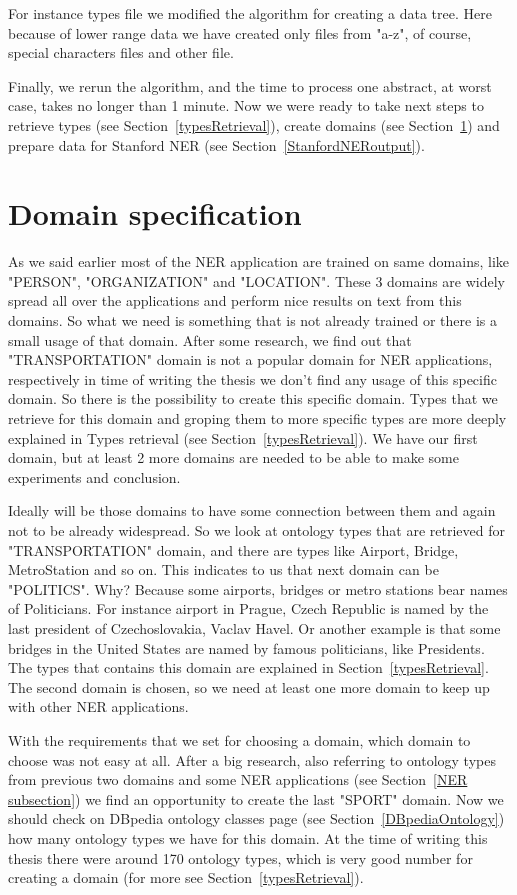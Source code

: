\documentclass[thesis=M,english]{FITthesis}[2018/05/30]
\begin{document}
	For instance types file we modified the algorithm for creating a data tree. Here because of lower range data we have created only files from "a-z", of course, special characters files and other file.

	Finally, we rerun the algorithm, and the time to process one abstract, at worst case, takes no longer than 1 minute. Now we were ready to take next steps to retrieve types (see Section~\ref{typesRetrieval}), create domains (see Section~\ref{domainSpecification}) and prepare data for Stanford NER (see Section~\ref{StanfordNERoutput}).

\section{Domain specification}\label{domainSpecification}
	As we said earlier most of the NER application are trained on same domains, like "PERSON", "ORGANIZATION" and "LOCATION". These 3 domains are widely spread all over the applications and perform nice results on text from this domains. So what we need is something that is not already trained or there is a small usage of that domain. After some research, we find out that "TRANSPORTATION" domain is not a popular domain for NER applications, respectively in time of writing the thesis we don't find any usage of this specific domain. So there is the possibility to create this specific domain. Types that we retrieve for this domain and groping them to more specific types are more deeply explained in Types retrieval (see Section~\ref{typesRetrieval}). We have our first domain, but at least 2 more domains are needed to be able to make some experiments and conclusion. 

	Ideally will be those domains to have some connection between them and again not to be already widespread. So we look at ontology types that are retrieved for "TRANSPORTATION" domain, and there are types like Airport, Bridge, MetroStation and so on. This indicates to us that next domain can be "POLITICS". Why? Because some airports, bridges or metro stations bear names of Politicians. For instance airport in Prague, Czech Republic is named by the last president of Czechoslovakia, Vaclav Havel. Or another example is that some bridges in the United States are named by famous politicians, like Presidents. The types that contains this domain are explained in Section~\ref{typesRetrieval}. The second domain is chosen, so we need at least one more domain to keep up with other NER applications. 
	
	With the requirements that we set for choosing a domain, which domain to choose was not easy at all. After a big research, also referring to ontology types from previous two domains and some NER applications (see Section~\ref{NER subsection}) we find an opportunity to create the last "SPORT" domain. Now we should check on DBpedia ontology classes page (see Section~\ref{DBpediaOntology}) how many ontology types we have for this domain. At the time of writing this thesis there were around 170 ontology types, which is very good number for creating a domain (for more see Section~\ref{typesRetrieval}).
	
\end{document}
